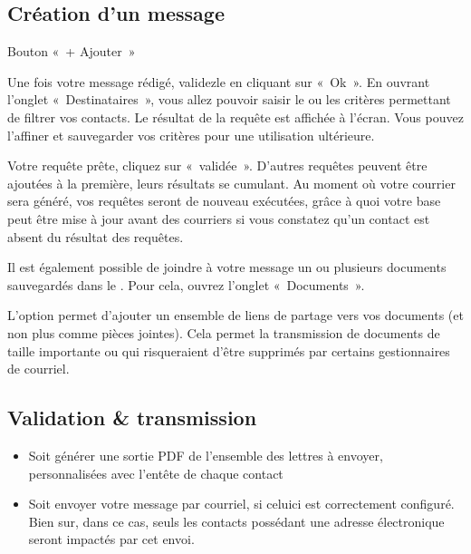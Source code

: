 \documentclass[a4paper,10pt,oneside,french]{sphinxmanual}
\begin{document}
\subsection{Création d’un message}
\label{\detokenize{mailing/mailing:creation-d-un-message}}
\sphinxAtStartPar
Bouton « + Ajouter »

\sphinxAtStartPar
Une fois votre message rédigé, validez\sphinxhyphen{}le en cliquant sur « Ok ». En ouvrant l’onglet « Destinataires », vous allez pouvoir saisir le ou les critères permettant de filtrer vos contacts. Le résultat de la requête est affichée à l’écran. Vous pouvez l’affiner et sauvegarder vos critères pour une utilisation ultérieure.

\sphinxAtStartPar
Votre requête prête, cliquez sur « validée ». D’autres requêtes peuvent être ajoutées à la première, leurs résultats se cumulant.
Au moment où votre courrier sera généré, vos requêtes seront de nouveau exécutées, grâce à quoi votre base peut être mise à jour avant  des courriers si vous constatez qu’un contact est absent du résultat des requêtes.

\sphinxAtStartPar
Il est également possible de joindre à votre message un ou plusieurs documents sauvegardés dans le . Pour cela, ouvrez l’onglet « Documents ».

\sphinxAtStartPar
L’option  permet d’ajouter un ensemble de liens de partage vers vos documents (et non plus comme pièces jointes). Cela permet la transmission de documents de taille importante ou qui risqueraient d’être supprimés par certains gestionnaires de courriel.

\noindent{}


\subsection{Validation \& transmission}
\label{\detokenize{mailing/mailing:validation-transmission}}\begin{description}
\begin{itemize}
\item {} 
\sphinxAtStartPar
Soit générer une sortie PDF de l’ensemble des lettres à envoyer, personnalisées avec l’en\sphinxhyphen{}tête de chaque contact

\item {} 
\sphinxAtStartPar
Soit envoyer votre message par courriel, si celui\sphinxhyphen{}ci est correctement configuré. Bien sur, dans ce cas, seuls les contacts possédant une adresse électronique seront impactés par cet envoi.

\end{itemize}

\end{description}
\end{document}
